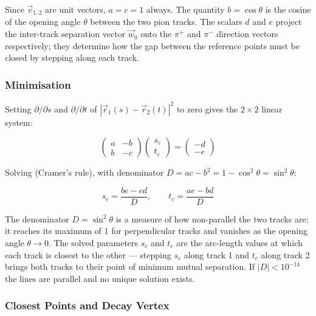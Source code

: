 \noindent
Since $\vec{v}_{1,2}$ are unit vectors, $a = c = 1$ always. The quantity $b = \cos\theta$ is the cosine of the opening angle $\theta$ between the two pion tracks. The scalars $d$ and $e$ project the inter-track separation vector $\vec{w}_0$ onto the $\pi^+$ and $\pi^-$ direction vectors respectively; they determine how the gap between the reference points must be closed by stepping along each track.

\subsubsection{Minimisation}

Setting $\partial/\partial s$ and $\partial/\partial t$ of
$|\vec{r}_1(s) - \vec{r}_2(t)|^2$ to zero gives the $2 \times 2$ linear system:

\begin{equation}
    \begin{pmatrix} a & -b \\ b & -c \end{pmatrix}
    \begin{pmatrix} s_c \\ t_c \end{pmatrix}
    = \begin{pmatrix} -d \\ -e \end{pmatrix}
\end{equation}

Solving (Cramer's rule), with denominator $D = ac - b^2 = 1 - \cos^2\theta = \sin^2\theta$:

\begin{equation}
    \boxed{s_c = \frac{be - cd}{D}, \qquad t_c = \frac{ae - bd}{D}}
\end{equation}

\noindent
The denominator $D = \sin^2\theta$ is a measure of how non-parallel the two tracks are; it reaches its maximum of 1 for perpendicular tracks and vanishes as the opening angle $\theta \to 0$. The solved parameters $s_c$ and $t_c$ are the arc-length values at which each track is closest to the other --- stepping $s_c$ along track 1 and $t_c$ along track 2 brings both tracks to their point of minimum mutual separation. If $|D| < 10^{-14}$ the lines are parallel and no unique solution exists.

\subsubsection{Closest Points and Decay Vertex}

